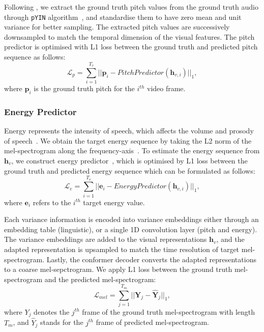 \documentclass[letterpaper]{article} %
\begin{document}
Following \cite{lancucki2021fastpitch}, we extract the ground truth pitch values from the ground truth audio through \texttt{pYIN} algorithm~\cite{mauch2014pyin}, and standardise them to have zero mean and unit variance for better sampling.
The extracted pitch values are successively downsampled to match the temporal dimension of the visual features.
The pitch predictor is optimised with L1 loss between the ground truth and predicted pitch sequence as follows:
\begin{equation}
\mathcal{L}_{p}=\sum_{i=1}^{T_v}||\boldsymbol{p}_{i}-PitchPredictor(\boldsymbol{h}_{v,i})||_1,
\end{equation}
where $\boldsymbol{p}_{i}$ is the ground truth pitch for the $i^{th}$ video frame.

\subsubsection{Energy Predictor}
Energy represents the intensity of speech, which affects the volume and prosody of speech~\cite{bulut2007analysis}. We obtain the target energy sequence by taking the L2 norm of the mel-spectrogram along the frequency-axis~\cite{choi2021neural}.
To estimate the energy sequence from $\boldsymbol{h}_v$, we construct energy predictor~\cite{ren2020fastspeech2}, which is optimised by L1 loss between the ground truth and predicted energy sequence which can be formulated as follows:
\begin{equation}
\mathcal{L}_{e}=\sum_{i=1}^{T_v}||\boldsymbol{e}_{i}-EnergyPredictor(\boldsymbol{h}_{v,i})||_1,
\end{equation}
where $\boldsymbol{e}_{i}$ refers to the $i^{th}$ target energy value.

Each variance information is encoded into variance embeddings either through an embedding table (linguistic), or a single 1D convolution layer (pitch and energy).
The variance embeddings are added to the visual representations $\boldsymbol{h}_v$, and the adapted representation is upsampled to match the time resolution of target mel-spectrogram.
Lastly, the conformer decoder converts the adapted representations to a coarse mel-sepctrogram.
We apply L1 loss between the ground truth mel-spectrogram and the predicted mel-spectrogram:
\begin{equation}
\mathcal{L}_{mel}=\sum_{j=1}^{T_m}||\boldsymbol{Y}_{j}-\boldsymbol{\hat{Y}}_{j}||_1,
\end{equation}
where $Y_{j}$ denotes the $j^{th}$ frame of the ground truth mel-spectrogram with length ${T_m}$, and $\hat{Y}_{j}$ stands for the $j^{th}$ frame of predicted mel-spectrogram.
\end{document}
